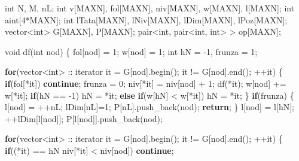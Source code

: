 \documentclass[10pt,]{article}
\newenvironment{Shaded}{}{}
\newcommand{\KeywordTok}[1]{\textcolor[rgb]{0.00,0.44,0.13}{\textbf{{#1}}}}
\newcommand{\DataTypeTok}[1]{\textcolor[rgb]{0.56,0.13,0.00}{{#1}}}
\newcommand{\DecValTok}[1]{\textcolor[rgb]{0.25,0.63,0.44}{{#1}}}
\newcommand{\NormalTok}[1]{{#1}}
\begin{document}
\begin{Shaded}
\begin{Highlighting}[]
\DataTypeTok{int} \NormalTok{N, M, nL;}
\DataTypeTok{int} \NormalTok{v[MAXN], fol[MAXN], niv[MAXN], w[MAXN], l[MAXN];}
\DataTypeTok{int} \NormalTok{aint[}\DecValTok{4}\NormalTok{*MAXN];}
\DataTypeTok{int} \NormalTok{lTata[MAXN], lNiv[MAXN], lDim[MAXN], lPoz[MAXN];}
\NormalTok{vector<}\DataTypeTok{int}\NormalTok{> G[MAXN], P[MAXN];}
\NormalTok{pair<}\DataTypeTok{int}\NormalTok{, pair<}\DataTypeTok{int}\NormalTok{, }\DataTypeTok{int}\NormalTok{> > op[MAXN];}

\DataTypeTok{void} \NormalTok{df(}\DataTypeTok{int} \NormalTok{nod) \{}
  \NormalTok{fol[nod] = }\DecValTok{1}\NormalTok{;}
  \NormalTok{w[nod] = }\DecValTok{1}\NormalTok{;}
  \DataTypeTok{int} \NormalTok{hN = -}\DecValTok{1}\NormalTok{, frunza = }\DecValTok{1}\NormalTok{;}

  \KeywordTok{for}\NormalTok{(vector<}\DataTypeTok{int}\NormalTok{> :: iterator it = G[nod].begin(); it != G[nod].end(); ++it) \{}
    \KeywordTok{if}\NormalTok{(fol[*it])}
      \KeywordTok{continue}\NormalTok{;}
    \NormalTok{frunza = }\DecValTok{0}\NormalTok{;}
    \NormalTok{niv[*it] = niv[nod] + }\DecValTok{1}\NormalTok{;}
    \NormalTok{df(*it);}
    \NormalTok{w[nod] += w[*it];}
    \KeywordTok{if}\NormalTok{(hN == -}\DecValTok{1}\NormalTok{)}
      \NormalTok{hN = *it;}
    \KeywordTok{else} \KeywordTok{if}\NormalTok{(w[hN] < w[*it])}
      \NormalTok{hN = *it;}
  \NormalTok{\}}
  \KeywordTok{if}\NormalTok{(frunza) \{}
    \NormalTok{l[nod] = ++nL;}
    \NormalTok{lDim[nL]=}\DecValTok{1}\NormalTok{;}
    \NormalTok{P[nL].push_back(nod);}
    \KeywordTok{return}\NormalTok{;}
  \NormalTok{\}}
  \NormalTok{l[nod] = l[hN];}
  \NormalTok{++lDim[l[nod]];}
  \NormalTok{P[l[nod]].push_back(nod);}

  \KeywordTok{for}\NormalTok{(vector<}\DataTypeTok{int}\NormalTok{> :: iterator it = G[nod].begin(); it != G[nod].end(); ++it) \{}
    \KeywordTok{if}\NormalTok{((*it) == hN \textbar{}\textbar{} niv[*it] < niv[nod])}
      \KeywordTok{continue}\NormalTok{;}


\end{Highlighting}
\end{Shaded}
\end{document}
